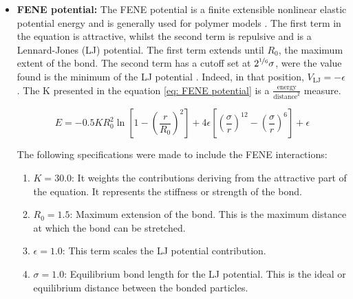 \begin{itemize}
    \item \textbf{FENE potential: }The FENE potential is a finite extensible nonlinear elastic potential energy and is generally used for polymer models
    \cite{steveplimptonLAMMPS,thompsonLAMMPSFlexibleSimulation2022}. 
    The first term in the equation is attractive, whilst the second term is repulsive and is a Lennard-Jones (LJ) potential. The first term extends until $R_0$, the maximum extent of the bond. The second term has a cutoff set at $2^{\nicefrac{1}{6}} \sigma$, were the value found is the minimum of the LJ potential
    \cite{thompsonLAMMPSFlexibleSimulation2022}. 
    Indeed, in that position, $V_{\text{LJ}} = -\epsilon$.
    The K presented in the equation \ref{eq: FENE potential} is a $\frac{\text{energy}}{\text{distance}^2}$ measure.

    \begin{equation} \label{eq: FENE potential}
        E = -0.5 K R_0^2 \ln{\left[1 - \left(\frac{r}{R_0}\right)^2\right]} + 4 \epsilon \left[\left(\frac{\sigma}{r}\right)^{12} - \left(\frac{\sigma}{r}\right)^6\right] + \epsilon
    \end{equation}

    The following specifications were made to include the FENE interactions:
    \begin{enumerate} %
        \item $K = 30.0$: It weights the contributions deriving from the attractive part of the equation. It represents the stiffness or strength of the bond.
        \item $R_0 = 1.5$: Maximum extension of the bond. This is the maximum distance at which the bond can be stretched.
        \item $\epsilon = 1.0$: This term scales the LJ potential contribution.
        \item $\sigma = 1.0$: Equilibrium bond length for the LJ potential. This is the ideal or equilibrium distance between the bonded particles.
    \end{enumerate}



\end{itemize}
